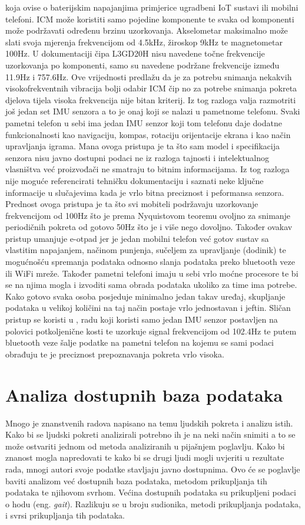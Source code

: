 \documentclass[times, utf8, diplomski]{fer}
\begin{document}
koja ovise o baterijskim napajanjima primjerice ugradbeni IoT sustavi ili mobilni telefoni. ICM može koristiti samo pojedine
komponente te svaka od komponenti može podržavati određenu brzinu uzorkovanja. Akselometar maksimalno može slati svoja mjerenja
frekvencijom od 4.5kHz, žiroskop 9kHz te magnetometar 100Hz. U dokumentaciji čipa L3GD20H nisu navedene točne frekvencije
uzorkovanja po komponenti, samo su navedene podržane frekvencije između 11.9Hz i 757.6Hz. Ove vrijednosti predlažu da je za
potrebu snimanja nekakvih visokofrekventnih vibracija bolji odabir ICM čip no za potrebe snimanja pokreta djelova tijela visoka
frekvencija nije bitan kriterij. Iz tog razloga valja razmotriti još jedan set IMU senzora a to je onaj koji se nalazi u pametnome
telefonu. Svaki pametni telefon u sebi ima jedan IMU senzor koji tom telefonu daje dodatne funkcionalnosti kao navigaciju, kompas,
rotaciju orijentacije ekrana i kao način upravljanja igrama. Mana ovoga pristupa je ta što sam model i specifikacija senzora
nisu javno dostupni podaci ne iz razloga tajnosti i intelektualnog vlasništva već proizvođači ne smatraju to bitnim informacijama.
Iz tog razloga nije moguće referencirati tehničku dokumentaciju i saznati neke ključne informacije u slučajevima kada je vrlo 
bitna preciznost i peformansa senzora. Prednost ovoga pristupa je ta što svi mobiteli podržavaju uzorkovanje frekvencijom od 
100Hz što je prema Nyquistovom teoremu ovoljno za snimanje periodičnih pokreta od gotovo 50Hz što je i više nego dovoljno.
Također ovakav pristup umanjuje e-otpad jer je jedan mobilni telefon već gotov sustav sa vlastitim napajanjem, načinom punjenja,
sučeljem za upravljanje (dodinik) te mogućnošću spremanja podataka odnosno slanja podataka preko bluetooth veze ili WiFi mreže.
Također pametni telefoni imaju u sebi vrlo moćne procesore te bi se na njima mogla i izvoditi sama obrada podataka ukoliko za time
ima potrebe. Kako gotovo svaka osoba posjeduje minimalno jedan takav uređaj, skupljanje podataka u velikoj količini na taj način
postaje vrlo jednostavan i jeftin. Sličan pristup se koristi u \cite{android}, radu koji koristi samo jedan IMU senzor
postavljen na polovici potkoljenične kosti te uzorkuje signal frekvencijom od 102.4Hz te putem bluetooth veze šalje podatke na 
pametni telefon na kojemu se sami podaci obrađuju te je preciznost prepoznavanja pokreta vrlo visoka.

\section{Analiza dostupnih baza podataka}
Mnogo je znanstvenih radova napisano na temu ljudskih pokreta i analizu istih. Kako bi se ljudski pokreti analizirali potrebno ih 
je na neki način snimiti a to se može ostvariti jednom od metoda analiziranih u pijašnjem poglavlju. Kako bi znanost mogla
napredovati te kako bi se drugi ljudi mogli uvjeriti u rezultate rada, mnogi autori svoje podatke stavljaju javno dostupnima.
Ovo će se poglavlje baviti analizom već dostupnih baza podataka, metodom prikupljanja tih podataka te njihovom svrhom.
Većina dostupnih podataka su prikupljeni podaci o hodu (eng. \textit{gait}). Razlikuju se u broju sudionika, metodi prikupljanja
podataka, i svrsi prikupljanja tih podataka.
\end{document}
